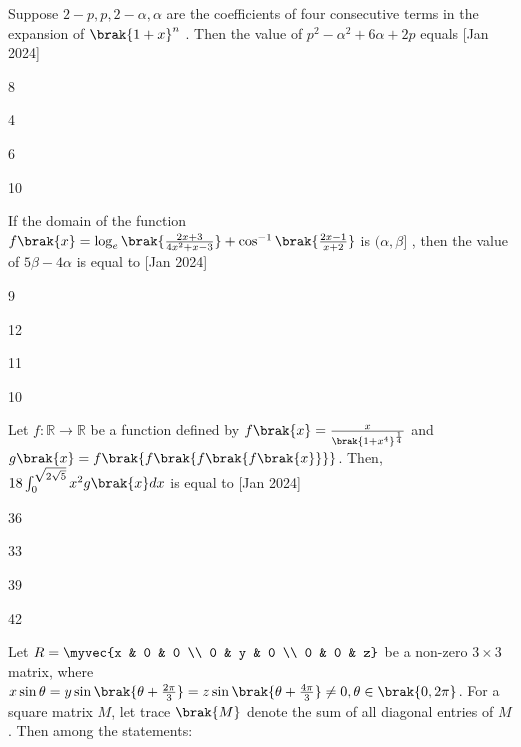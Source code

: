   \item Suppose $2-p, p, 2 - \alpha, \alpha$
 are the coefficients of four consecutive terms in the expansion of $\brak{1 + x}^n$
. Then the value of $p^2 - \alpha^2 + 6\alpha + 2p$
 equals \hfill[Jan 2024]
 \begin{enumerate}
     \begin{multicols}{2}
        \item 8
        \item 4
        \item 6
        \item 10
     \end{multicols}
 \end{enumerate}
 \item If the domain of the function $f\brak{x} = \log_e\brak{\frac{2x +3}{4x^2 + x -3}} + \cos^{-1}\brak{\frac{2x-1}{x+2}} $ is $ (\alpha, \beta ] $  , then the value of $5\beta - 4\alpha$
 is equal to \hfill[Jan 2024]
 \begin{enumerate}
     \begin{multicols}{2}
         \item 9
         \item 12
         \item 11
         \item 10
     \end{multicols}
 \end{enumerate}
 \item Let $f : \mathbb{R} \to \mathbb{R}$ be a function defined by $f\brak{x} = \frac{x}{\brak{1 + x^4} ^{\frac{1}{4}}}$ and $g\brak{x} = f\brak{f\brak{f\brak{f\brak{x}}}}$. Then, $18 \int_0^{\sqrt{2\sqrt{5}}} x^2 g\brak{x}dx$ is equal to \hfill[Jan 2024]
 \begin{enumerate}
     \begin{multicols}{2}
         \item 36
         \item 33
         \item 39
         \item 42
     \end{multicols}
 \end{enumerate}
 \item Let $R = \myvec{x & 0 & 0 \\ 0 & y & 0 \\ 0 & 0 & z}$ be a non-zero $3 \times 3$ matrix, where $x\sin{\theta} = y \sin{\brak{\theta + \frac{2\pi}{3}}} = z \sin{\brak{\theta + \frac{4\pi}{3}}} \ne 0, \theta \in \brak{0 , 2\pi}$. For a square matrix $M$, let trace $\brak{M}$ denote the sum of all diagonal entries of $M$. Then among the statements: \\ \\
